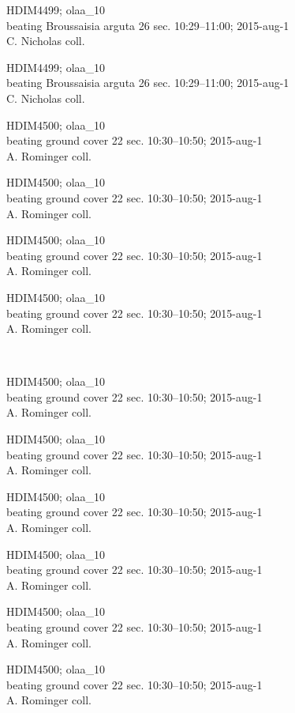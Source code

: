 \documentclass[2pt]{extarticle}
\begin{document}
\noindent
\parbox{0.16\textwidth}{\tiny \raggedright \rule[-0.3\baselineskip]{0pt}{10pt}HDIM4499; olaa\_10\\ beating Broussaisia arguta 26 sec. 10:29--11:00; 2015-aug-1\\ C. Nicholas coll.}
\parbox{0.16\textwidth}{\tiny \raggedright \rule[-0.3\baselineskip]{0pt}{10pt}HDIM4499; olaa\_10\\ beating Broussaisia arguta 26 sec. 10:29--11:00; 2015-aug-1\\ C. Nicholas coll.}
\parbox{0.16\textwidth}{\tiny \raggedright \rule[-0.3\baselineskip]{0pt}{10pt}HDIM4500; olaa\_10\\ beating ground cover 22 sec. 10:30--10:50; 2015-aug-1\\ A. Rominger coll.}
\parbox{0.16\textwidth}{\tiny \raggedright \rule[-0.3\baselineskip]{0pt}{10pt}HDIM4500; olaa\_10\\ beating ground cover 22 sec. 10:30--10:50; 2015-aug-1\\ A. Rominger coll.}
\parbox{0.16\textwidth}{\tiny \raggedright \rule[-0.3\baselineskip]{0pt}{10pt}HDIM4500; olaa\_10\\ beating ground cover 22 sec. 10:30--10:50; 2015-aug-1\\ A. Rominger coll.}
\parbox{0.16\textwidth}{\tiny \raggedright \rule[-0.3\baselineskip]{0pt}{10pt}HDIM4500; olaa\_10\\ beating ground cover 22 sec. 10:30--10:50; 2015-aug-1\\ A. Rominger coll.} \\ 
\vspace{0.001in} 

\noindent
\parbox{0.16\textwidth}{\tiny \raggedright \rule[-0.3\baselineskip]{0pt}{10pt}HDIM4500; olaa\_10\\ beating ground cover 22 sec. 10:30--10:50; 2015-aug-1\\ A. Rominger coll.}
\parbox{0.16\textwidth}{\tiny \raggedright \rule[-0.3\baselineskip]{0pt}{10pt}HDIM4500; olaa\_10\\ beating ground cover 22 sec. 10:30--10:50; 2015-aug-1\\ A. Rominger coll.}
\parbox{0.16\textwidth}{\tiny \raggedright \rule[-0.3\baselineskip]{0pt}{10pt}HDIM4500; olaa\_10\\ beating ground cover 22 sec. 10:30--10:50; 2015-aug-1\\ A. Rominger coll.}
\parbox{0.16\textwidth}{\tiny \raggedright \rule[-0.3\baselineskip]{0pt}{10pt}HDIM4500; olaa\_10\\ beating ground cover 22 sec. 10:30--10:50; 2015-aug-1\\ A. Rominger coll.}
\parbox{0.16\textwidth}{\tiny \raggedright \rule[-0.3\baselineskip]{0pt}{10pt}HDIM4500; olaa\_10\\ beating ground cover 22 sec. 10:30--10:50; 2015-aug-1\\ A. Rominger coll.}
\parbox{0.16\textwidth}{\tiny \raggedright \rule[-0.3\baselineskip]{0pt}{10pt}HDIM4500; olaa\_10\\ beating ground cover 22 sec. 10:30--10:50; 2015-aug-1\\ A. Rominger coll.} \\ 
\vspace{0.001in} 
\end{document}
